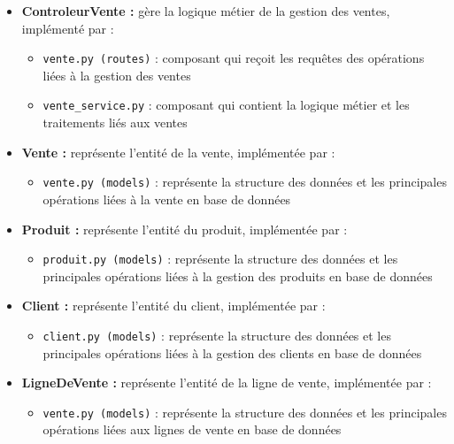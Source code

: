 \begin{itemize}[leftmargin=2em, topsep=4pt, itemsep=4pt]
  \begin{itemize}[leftmargin=2em, topsep=2pt, itemsep=2pt]
    \item \texttt{ConfirmDialog.jsx} : fenêtre de confirmation ou d'annulation de l'archivage
  \end{itemize}
  \item \textbf{ControleurVente :} gère la logique métier de la gestion des ventes, implémenté par :
  \begin{itemize}[leftmargin=2em, topsep=2pt, itemsep=2pt]
    \item \texttt{vente.py (routes)} : composant qui reçoit les requêtes des opérations liées à la gestion des ventes
    \item \texttt{vente\_service.py} : composant qui contient la logique métier et les traitements liés aux ventes
  \end{itemize}
  \item \textbf{Vente :} représente l'entité de la vente, implémentée par :
  \begin{itemize}[leftmargin=2em, topsep=2pt, itemsep=2pt]
    \item \texttt{vente.py (models)} : représente la structure des données et les principales opérations liées à la vente en base de données
  \end{itemize}
  \item \textbf{Produit :} représente l'entité du produit, implémentée par :
  \begin{itemize}[leftmargin=2em, topsep=2pt, itemsep=2pt]
    \item \texttt{produit.py (models)} : représente la structure des données et les principales opérations liées à la gestion des produits en base de données
  \end{itemize}
  \item \textbf{Client :} représente l'entité du client, implémentée par :
  \begin{itemize}[leftmargin=2em, topsep=2pt, itemsep=2pt]
    \item \texttt{client.py (models)} : représente la structure des données et les principales opérations liées à la gestion des clients en base de données
  \end{itemize}
  \item \textbf{LigneDeVente :} représente l'entité de la ligne de vente, implémentée par :
  \begin{itemize}[leftmargin=2em, topsep=2pt, itemsep=2pt]
    \item \texttt{vente.py (models)} : représente la structure des données et les principales opérations liées aux lignes de vente en base de données

\end{itemize}
\end{itemize}

